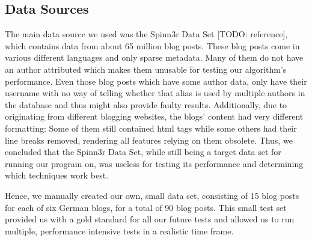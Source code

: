 
\subsection{Data Sources}
\label{sec:data_sources}

The main data source we used was the Spinn3r Data Set [TODO: reference], which contains data from about 65 million blog posts.
These blog posts come in various different languages and only sparse metadata.
Many of them do not have an author attributed which makes them unusable for testing our algorithm's performance.
Even those blog posts which have some author data, only have their username with no way of telling whether that alias is used by multiple authors in the database and thus might also provide faulty results.
Additionally, due to originating from different blogging websites, the blogs' content had very different formatting: Some of them still contained html tags while some others had their line breaks removed, rendering all features relying on them obsolete. %
Thus, we concluded that the Spinn3r Data Set, while still being a target data set for running our program on, was useless for testing its performance and determining which techniques work best.


Hence, we manually created our own, small data set, consisting of 15 blog posts for each of six German blogs, for a total of 90 blog posts.
This small test set provided us with a gold standard for all our future tests and allowed us to run multiple, performance intensive tests in a realistic time frame.